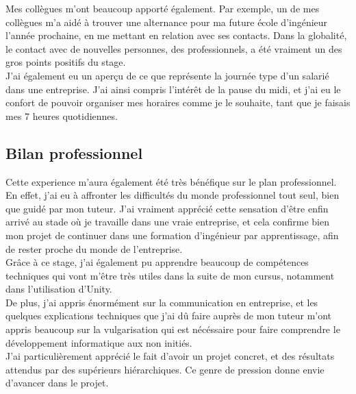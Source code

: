 \documentclass[a4paper]{article}
\begin{document}
        Mes collègues m'ont beaucoup apporté également. Par exemple, un de mes collègues m'a aidé à trouver une alternance pour ma future école d'ingénieur l'année prochaine, en me mettant en relation avec ses contacts. Dans la globalité, le contact avec de nouvelles personnes, des professionnels, a été vraiment un des gros points positifs du stage. \\

        J'ai également eu un aperçu de ce que représente la journée type d'un salarié dans une entreprise. J'ai ainsi compris l'intérêt de la pause du midi, et j'ai eu le confort de pouvoir organiser mes horaires comme je le souhaite, tant que je faisais mes 7 heures quotidiennes. \\

        \vfill

        \hrulefill

        \vfill

    \subsection{Bilan professionnel}

    Cette experience m'aura également été très bénéfique sur le plan professionnel. En effet, j'ai eu à affronter les difficultés du monde professionnel tout seul, bien que guidé par mon tuteur. J'ai vraiment apprécié cette sensation d'être enfin arrivé au stade où je travaille dans une vraie entreprise, et cela confirme bien mon projet de continuer dans une formation d'ingénieur par apprentissage, afin de rester proche du monde de l'entreprise. \\

    Grâce à ce stage, j'ai également pu apprendre beaucoup de compétences techniques qui vont m'être très utiles dans la suite de mon cursus, notamment dans l'utilisation d'Unity. \\ 

    De plus, j'ai appris énormément sur la communication en entreprise, et les quelques explications techniques que j'ai dû faire auprès de mon tuteur m'ont appris beaucoup sur la vulgarisation qui est nécéssaire pour faire comprendre le développement informatique aux non initiés. \\ 

    J'ai particulièrement apprécié le fait d'avoir un projet concret, et des résultats attendus par des supérieurs hiérarchiques. Ce genre de pression donne envie d'avancer dans le projet. \\
    
\end{document}
